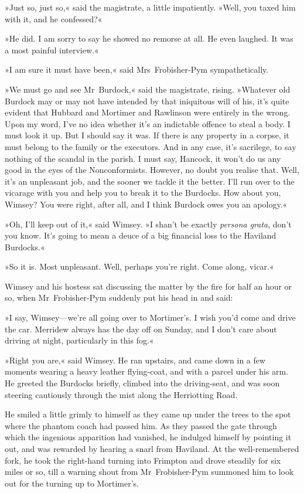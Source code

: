 »Just so, just so,« said the magistrate, a little impatiently. »Well, you taxed him with it, and he confessed?«

»He did. I am sorry to say he showed no remorse at all. He even laughed. It was a most painful interview.«

»I am sure it must have been,« said Mrs~Frobisher-Pym sympathetically.

»We must go and see Mr~Burdock,« said the magistrate, rising. »Whatever old Burdock may or may not have intended by that iniquitous will of his, it's quite evident that Hubbard and Mortimer and Rawlinson were entirely in the wrong. Upon my word, I've no idea whether it's an indictable offence to steal a body. I must look it up. But I should say it was. If there is any property in a corpse, it must belong to the family or the executors. And in any case, it's sacrilege, to say nothing of the scandal in the parish. I must say, Hancock, it won't do us any good in the eyes of the Nonconformists. However, no doubt you realise that. Well, it's an unpleasant job, and the sooner we tackle it the better. I'll run over to the vicarage with you and help you to break it to the Burdocks. How about you, Wimsey? You were right, after all, and I think Burdock owes you an apology.«

»Oh, I'll keep out of it,« said Wimsey. »I shan't be exactly \textit{persona grata}, don't you know. It's going to mean a deuce of a big financial loss to the Haviland Burdocks.«

»So it is. Most unpleasant. Well, perhaps you're right. Come along, vicar.«

Wimsey and his hostess sat discussing the matter by the fire for half an hour or so, when Mr~Frobisher-Pym suddenly put his head in and said:

»I say, Wimsey—we're all going over to Mortimer's. I wish you'd come and drive the car. Merridew always has the day off on Sunday, and I don't care about driving at night, particularly in this fog.«

»Right you are,« said Wimsey. He ran upstairs, and came down in a few moments wearing a heavy leather flying-coat, and with a parcel under his arm. He greeted the Burdocks briefly, climbed into the driving-seat, and was soon steering cautiously through the mist along the Herriotting Road.

He smiled a little grimly to himself as they came up under the trees to the spot where the phantom coach had passed him. As they passed the gate through which the ingenious apparition had vanished, he indulged himself by pointing it out, and was rewarded by hearing a snarl from Haviland. At the well-remembered fork, he took the right-hand turning into Frimpton and drove steadily for six miles or so, till a warning shout from Mr~Frobisher-Pym summoned him to look out for the turning up to Mortimer's.

